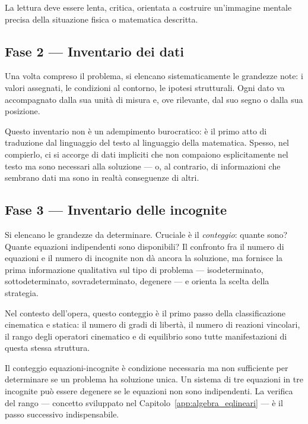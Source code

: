 La lettura deve essere lenta, critica, orientata a costruire un'immagine mentale precisa della situazione fisica o matematica descritta.


\subsection*{Fase 2 --- Inventario dei dati}

Una volta compreso il problema, si elencano sistematicamente le grandezze note: i valori assegnati, le condizioni al contorno, le ipotesi strutturali. Ogni dato va accompagnato dalla sua unità di misura e, ove rilevante, dal suo segno o dalla sua posizione.

Questo inventario non è un adempimento burocratico: è il primo atto di traduzione dal linguaggio del testo al linguaggio della matematica. Spesso, nel compierlo, ci si accorge di dati impliciti che non compaiono esplicitamente nel testo ma sono necessari alla soluzione --- o, al contrario, di informazioni che sembrano dati ma sono in realtà conseguenze di altri.


\subsection*{Fase 3 --- Inventario delle incognite}

Si elencano le grandezze da determinare. Cruciale è il \textit{conteggio}: quante sono? Quante equazioni indipendenti sono disponibili? Il confronto fra il numero di equazioni e il numero di incognite non dà ancora la soluzione, ma fornisce la prima informazione qualitativa sul tipo di problema --- isodeterminato, sottodeterminato, sovradeterminato, degenere --- e orienta la scelta della strategia.

Nel contesto dell'opera, questo conteggio è il primo passo della classificazione cinematica e statica: il numero di gradi di libertà, il numero di reazioni vincolari, il rango degli operatori cinematico e di equilibrio sono tutte manifestazioni di questa stessa struttura.

\begin{oss}
	Il conteggio equazioni-incognite è condizione necessaria ma non sufficiente per determinare se un problema ha soluzione unica. Un sistema di tre equazioni in tre incognite può essere degenere se le equazioni non sono indipendenti. La verifica del rango --- concetto sviluppato nel Capitolo~\ref{app:algebra_eqlineari} --- è il passo successivo indispensabile.
\end{oss}


